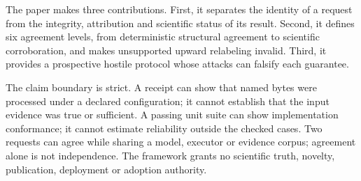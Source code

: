 The paper makes three contributions. First, it separates the identity of a request
from the integrity, attribution and scientific status of its result. Second, it
defines six agreement levels, from deterministic structural agreement to scientific
corroboration, and makes unsupported upward relabeling invalid. Third, it provides
a prospective hostile protocol whose attacks can falsify each guarantee.

The claim boundary is strict. A receipt can show that named bytes were processed
under a declared configuration; it cannot establish that the input evidence was
true or sufficient. A passing unit suite can show implementation conformance; it
cannot estimate reliability outside the checked cases. Two requests can agree while
sharing a model, executor or evidence corpus; agreement alone is not independence.
The framework grants no scientific truth, novelty, publication, deployment or
adoption authority.
